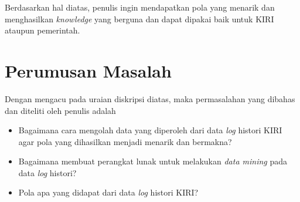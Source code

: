 Berdasarkan hal diatas, penulis ingin mendapatkan pola yang menarik dan menghasilkan \textsl{knowledge} yang berguna dan dapat dipakai baik untuk KIRI ataupun pemerintah.





\section{Perumusan Masalah}
Dengan mengacu pada uraian diskripsi diatas, maka permasalahan yang dibahas dan diteliti oleh penulis adalah
\begin{itemize}
	\item Bagaimana cara mengolah data yang diperoleh dari data \textsl{log} histori KIRI agar pola yang dihasilkan menjadi menarik dan bermakna?
	\item Bagaimana membuat perangkat lunak untuk melakukan \textsl{data mining} pada data \textsl{log} histori?
	\item Pola apa yang didapat dari data \textsl{log} histori KIRI?
\end{itemize}


